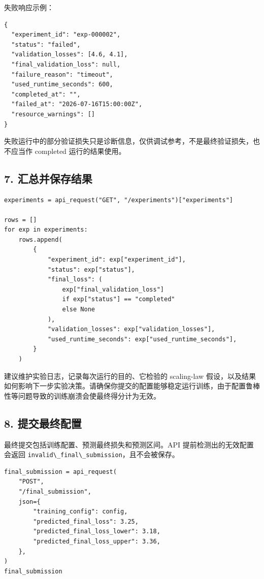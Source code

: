 \documentclass[
]{ctexart}
\newcommand{\passthrough}[1]{#1}
\begin{document}
失败响应示例：

\begin{verbatim}
{
  "experiment_id": "exp-000002",
  "status": "failed",
  "validation_losses": [4.6, 4.1],
  "final_validation_loss": null,
  "failure_reason": "timeout",
  "used_runtime_seconds": 600,
  "completed_at": "",
  "failed_at": "2026-07-16T15:00:00Z",
  "resource_warnings": []
}
\end{verbatim}

失败运行中的部分验证损失只是诊断信息，仅供调试参考，不是最终验证损失，也不应当作
completed 运行的结果使用。

\hypertarget{ux6c47ux603bux5e76ux4fddux5b58ux7ed3ux679c}{%
\subsection{7.
汇总并保存结果}\label{ux6c47ux603bux5e76ux4fddux5b58ux7ed3ux679c}}

\begin{verbatim}
experiments = api_request("GET", "/experiments")["experiments"]

rows = []
for exp in experiments:
    rows.append(
        {
            "experiment_id": exp["experiment_id"],
            "status": exp["status"],
            "final_loss": (
                exp["final_validation_loss"]
                if exp["status"] == "completed"
                else None
            ),
            "validation_losses": exp["validation_losses"],
            "used_runtime_seconds": exp["used_runtime_seconds"],
        }
    )
\end{verbatim}

建议维护实验日志，记录每次运行的目的、它检验的 scaling-law
假设，以及结果如何影响下一步实验决策。请确保你提交的配置能够稳定运行训练，由于配置鲁棒性等问题导致的训练崩溃会使最终得分计为无效。

\hypertarget{ux63d0ux4ea4ux6700ux7ec8ux914dux7f6e}{%
\subsection{8.
提交最终配置}\label{ux63d0ux4ea4ux6700ux7ec8ux914dux7f6e}}

最终提交包括训练配置、预测最终损失和预测区间。API 提前检测出的无效配置会返回
\passthrough{\lstinline!invalid\_final\_submission!}，且不会被保存。

\begin{verbatim}
final_submission = api_request(
    "POST",
    "/final_submission",
    json={
        "training_config": config,
        "predicted_final_loss": 3.25,
        "predicted_final_loss_lower": 3.18,
        "predicted_final_loss_upper": 3.36,
    },
)
final_submission
\end{verbatim}
\end{document}

